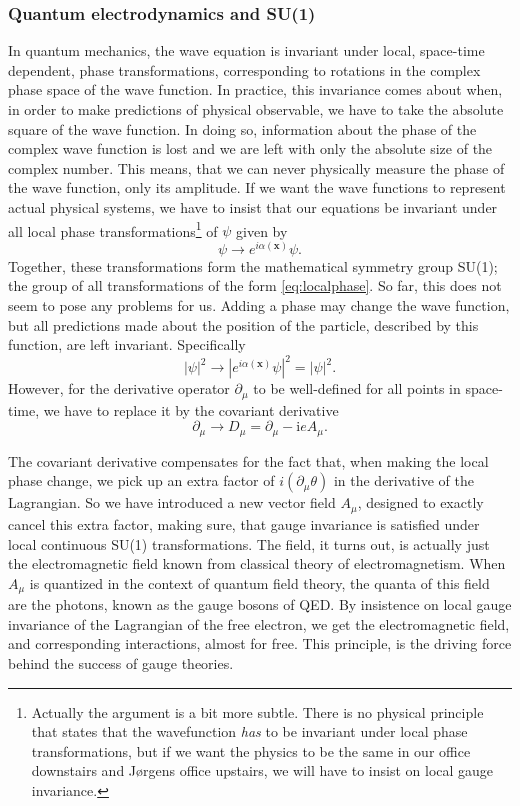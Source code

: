 \subsubsection{Quantum electrodynamics and SU(1)}
In quantum mechanics, the wave equation is invariant under local, space-time dependent, phase transformations, corresponding to rotations in the complex phase space of the wave function. In practice, this invariance comes about when, in order to make predictions of physical observable, we have to take the absolute square of the wave function. In doing so, information about the phase of the complex wave function is lost and we are left with only the absolute size of the complex number. This means, that we can never physically measure the phase of the wave function, only its amplitude. If we want the wave functions to represent actual physical systems, we have to insist that our equations be invariant under all local phase transformations\footnote{Actually the argument is a bit more subtle. There is no physical principle that states that the wavefunction \emph{has} to be invariant under local phase transformations, but if we want the physics to be the same in our office downstairs and Jørgens office upstairs, we will have to insist on local gauge invariance.} of $\psi$ given by
\begin{equation} \label{eq:localphase}
    \psi \rightarrow e^{i\alpha(\mathbf{x})} \psi.
\end{equation}
Together, these transformations form the mathematical symmetry group SU(1); the group of all transformations of the form \eqref{eq:localphase}.  So far, this does not seem to pose any problems for us. Adding a phase may change the wave function, but all predictions made about the position of the particle, described by this function, are left invariant. Specifically
\begin{equation}
	|\psi|^2 \rightarrow |e^{i\alpha(\mathbf{x})} \psi|^2 = |\psi|^2.
\end{equation}
However, for the derivative operator $\partial_\mu$ to be well-defined for all points in space-time, we have to replace it by the covariant derivative
\begin{equation} \label{eq:covariant}
	\partial_\mu \rightarrow D_\mu = \partial_\mu - \textrm{i}e A_\mu.
\end{equation}

The covariant derivative compensates for the fact that, when making the local phase change, we pick up an extra factor of $i (\partial_\mu \theta)$ in the derivative of the Lagrangian. So we have introduced a new vector field $A_\mu$, designed to exactly cancel this extra factor, making sure, that gauge invariance is satisfied under local continuous SU(1) transformations. The field, it turns out, is actually just the electromagnetic field known from classical theory of electromagnetism. When $A_\mu$ is quantized in the context of quantum field theory, the quanta of this field are the photons, known as the gauge bosons of QED. By insistence on local gauge invariance of the Lagrangian of the free electron, we get the electromagnetic field, and corresponding interactions, almost for free. This principle, is the driving force behind the success of gauge theories.

